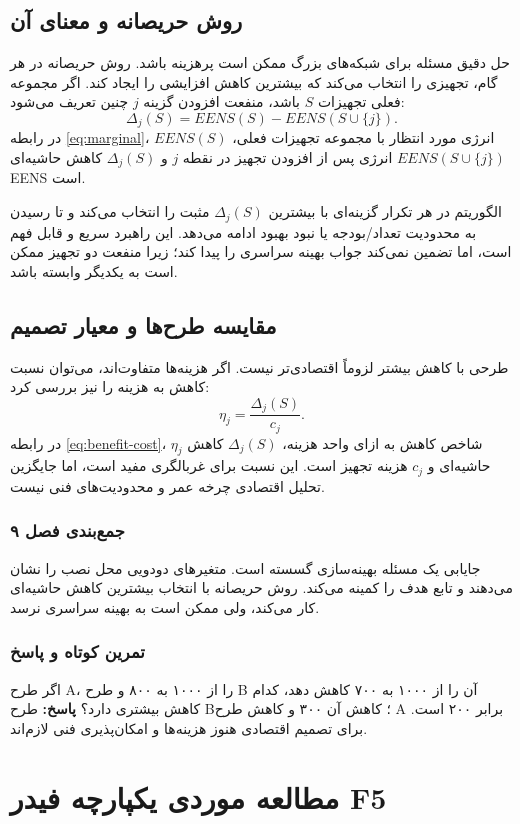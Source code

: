 \documentclass[11pt,a4paper,oneside]{book}
\newcommand{\summary}[1]{\subsection*{جمع‌بندی فصل #1}}
\newcommand{\exercise}{\subsection*{تمرین کوتاه و پاسخ}}
\newcommand{\answer}{\noindent\textbf{پاسخ:} }
\begin{document}
\section{روش حریصانه و معنای آن}
حل دقیق مسئله برای شبکه‌های بزرگ ممکن است پرهزینه باشد. روش حریصانه در هر گام، تجهیزی را انتخاب می‌کند که بیشترین کاهش  افزایشی را ایجاد کند. اگر مجموعه فعلی تجهیزات $S$ باشد، منفعت افزودن گزینه $j$ چنین تعریف می‌شود:
\begin{equation}
 \Delta_j(S)=EENS(S)-EENS(S\cup\{j\}).
 \label{eq:marginal}
\end{equation}
در رابطه \eqref{eq:marginal}، $EENS(S)$ انرژی مورد انتظار با مجموعه تجهیزات فعلی، $EENS(S\cup\{j\})$ انرژی پس از افزودن تجهیز در نقطه $j$ و $\Delta_j(S)$ کاهش حاشیه‌ای EENS است.

الگوریتم در هر تکرار گزینه‌ای با بیشترین $\Delta_j(S)$ مثبت را انتخاب می‌کند و تا رسیدن به محدودیت تعداد/بودجه یا نبود بهبود ادامه می‌دهد. این راهبرد سریع و قابل فهم است، اما تضمین نمی‌کند جواب بهینه سراسری را پیدا کند؛ زیرا منفعت دو تجهیز ممکن است به یکدیگر وابسته باشد.

\section{مقایسه طرح‌ها و معیار تصمیم}
طرحی با کاهش  بیشتر لزوماً اقتصادی‌تر نیست. اگر هزینه‌ها متفاوت‌اند، می‌توان نسبت کاهش  به هزینه را نیز بررسی کرد:
\begin{equation}
 \eta_j=\frac{\Delta_j(S)}{c_j}.
 \label{eq:benefit-cost}
\end{equation}
در رابطه \eqref{eq:benefit-cost}، $\eta_j$ شاخص کاهش  به ازای واحد هزینه، $\Delta_j(S)$ کاهش حاشیه‌ای و $c_j$ هزینه تجهیز است. این نسبت برای غربالگری مفید است، اما جایگزین تحلیل اقتصادی چرخه عمر و محدودیت‌های فنی نیست.

\summary{۹}
جایابی یک مسئله بهینه‌سازی گسسته است. متغیرهای دودویی محل نصب را نشان می‌دهند و تابع هدف  را کمینه می‌کند. روش حریصانه با انتخاب بیشترین کاهش حاشیه‌ای کار می‌کند، ولی ممکن است به بهینه سراسری نرسد.

\exercise
اگر طرح A،  را از ۱۰۰۰ به ۸۰۰  و طرح B آن را از ۱۰۰۰ به ۷۰۰  کاهش دهد، کدام کاهش  بیشتری دارد؟
\answer طرح B؛ کاهش آن ۳۰۰  و کاهش طرح A برابر ۲۰۰  است. برای تصمیم اقتصادی هنوز هزینه‌ها و امکان‌پذیری فنی لازم‌اند.

\chapter{مطالعه موردی یکپارچه فیدر F5}
\end{document}
